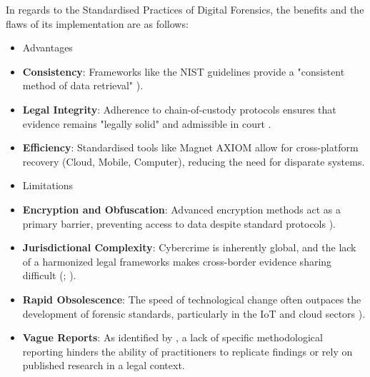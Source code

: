 \documentclass[12pt,a4paper]{article}
\begin{document}
In regards to the Standardised Practices of Digital Forensics, the benefits and the flaws of its implementation are as follows: 

\begin{itemize}
\item[$\blacksquare$] Advantages
\item \textbf{Consistency}: Frameworks like the NIST guidelines provide a "consistent method of data retrieval" \cite{hassan2025}).
\item \textbf{Legal Integrity}: Adherence to chain-of-custody protocols ensures that evidence remains "legally solid" and admissible in court \cite{ilyas2024role}.
\item \textbf{Efficiency}: Standardised tools like Magnet AXIOM allow for cross-platform recovery (Cloud, Mobile, Computer), reducing the need for disparate systems.
\item[$\blacksquare$] Limitations
\item \textbf{Encryption and Obfuscation}: Advanced encryption methods act as a primary barrier, preventing access to data despite standard protocols \cite{hassan2025}).
\item \textbf{Jurisdictional Complexity}: Cybercrime is inherently global, and the lack of a harmonized legal frameworks makes cross-border evidence sharing difficult (\cite{ARIF2025104296}; \cite{sharma2024digital}).
\item \textbf{Rapid Obsolescence}: The speed of technological change often outpaces the development of forensic standards, particularly in the IoT and cloud sectors \cite{hassan2025}).
\item \textbf{Vague Reports}: As identified by \cite{sharma2024digital}, a lack of specific methodological reporting hinders the ability of practitioners to replicate findings or rely on published research in a legal context.
\end{itemize}
\end{document}
